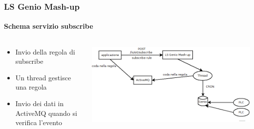 \documentclass{beamer}
\begin{document}
\begin{frame}
	\frametitle{LS Genio Mash-up}
	\framesubtitle{Schema servizio subscribe}
	\begin{columns}[T] %
		\begin{column}{.38\textwidth}
			\begin{itemize}
				\small
				\item Invio della regola di subscribe
				\item Un thread gestisce una regola
				\item Invio dei dati in ActiveMQ quando si verifica l'evento
				
			\end{itemize}
			
		\end{column}%
		\hfill%
		\begin{column}{.60\textwidth}
			\includegraphics[width=1\textwidth]{images/schema-subscribe.png}
		\end{column}%
	\end{columns}
\end{frame}
\end{document}
